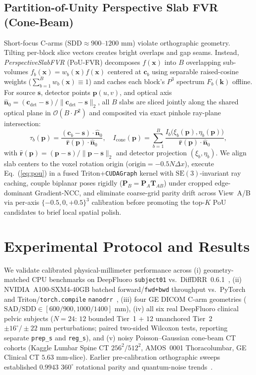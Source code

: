 \documentclass[runningheads]{llncs}
\begin{document}
\subsection{Partition-of-Unity Perspective Slab FVR (Cone-Beam)}
Short-focus C-arms ($\mathrm{SDD} \approx 900$--$1200\text{ mm}$) violate orthographic geometry. Tilting per-block slice vectors creates bright overlaps and gap seams. Instead, \emph{PerspectiveSlabFVR} (PoU-FVR) decomposes $f(\mathbf{x})$ into $B$ overlapping sub-volumes $f_b(\mathbf{x}) = w_b(\mathbf{x}) f(\mathbf{x})$ centered at $\mathbf{c}_b$ using separable raised-cosine weights ($\sum_{b=1}^B w_b(\mathbf{x}) \equiv 1$) and caches each block's $P^3$ spectrum $F_b(\mathbf{k})$ offline. For source $\mathbf{s}$, detector points $\mathbf{p}(u,v)$, and optical axis $\hat{\mathbf{n}}_0 = (\mathbf{c}_{\mathrm{det}}-\mathbf{s})/\|\mathbf{c}_{\mathrm{det}}-\mathbf{s}\|_2$, all $B$ slabs are sliced jointly along the shared optical plane in $\mathcal{O}(B \cdot P^2)$ and composited via exact pinhole ray-plane intersection:
\begin{equation}
\tau_b(\mathbf{p}) = \frac{(\mathbf{c}_b - \mathbf{s}) \cdot \hat{\mathbf{n}}_0}{\hat{\mathbf{r}}(\mathbf{p}) \cdot \hat{\mathbf{n}}_0}, \quad I_{\mathrm{cone}}(\mathbf{p}) = \sum_{b=1}^B \frac{I_b\big(\xi_b(\mathbf{p}), \eta_b(\mathbf{p})\big)}{\hat{\mathbf{r}}(\mathbf{p}) \cdot \hat{\mathbf{n}}_0},
\label{eq:pou}
\end{equation}
with $\hat{\mathbf{r}}(\mathbf{p}) = (\mathbf{p}-\mathbf{s})/\|\mathbf{p}-\mathbf{s}\|_2$ and detector projection $(\xi_b, \eta_b)$. We align slab centers to the voxel rotation origin ($\mathrm{origin} = -0.5 N \Delta x$), execute Eq.~(\ref{eq:pou}) in a fused Triton+\texttt{CUDAGraph} kernel with $\mathrm{SE}(3)$-invariant ray caching, couple biplanar poses rigidly ($\mathbf{P}_B = \mathbf{P}_A \mathbf{T}_{AB}$) under cropped edge-dominant Gradient-NCC, and eliminate coarse-grid parity drift across View~A/B via per-axis $\{-0.5, 0, +0.5\}^3$ calibration before promoting the top-$K$ PoU candidates to brief local spatial polish.

\section{Experimental Protocol and Results}
We validate calibrated physical-millimeter performance across (i) geometry-matched CPU benchmarks on DeepFluoro \texttt{subject01} vs.\ DiffDRR~0.6.1~\cite{killeen2023diffdrr}, (ii) NVIDIA~A100-SXM4-40GB batched forward/\texttt{fwd+bwd} throughput vs.\ PyTorch and Triton/\texttt{torch.compile} \texttt{nanodrr}~\cite{nanodrr2025}, (iii) four GE DICOM C-arm geometries ($\mathrm{SAD/SDD} \in [600/900, 1000/1400]\text{ mm}$), (iv) all six real DeepFluoro clinical pelvic subjects ($N{=}24$: $12$ bounded Tier~1 + $12$ unanchored Tier~2 $\pm 16^\circ/\pm 22\text{ mm}$ perturbations; paired two-sided Wilcoxon tests, reporting separate \texttt{prep\_s} and \texttt{reg\_s}), and (v) noisy Poisson--Gaussian cone-beam CT cohorts (Kaggle Lumbar Spine CT $256^2/512^2$, AMOS~0001 Thoracolumbar, GE Clinical CT $5.63\text{ mm}$-slice). Earlier pre-calibration orthographic sweeps established $0.9943$ $360^\circ$ rotational parity and quantum-noise trends~\cite{penney1998comparison}.
\end{document}

